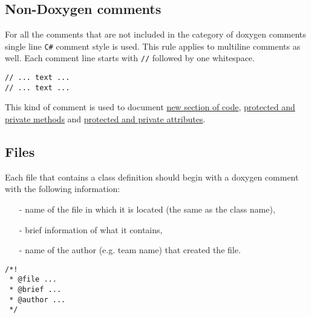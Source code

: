 \documentclass[10pt,a4paper]{article}
\begin{document}
\subsection{Non-Doxygen comments}
\noindent For all the comments that are not included in the category of doxygen comments single line \verb+C#+ comment style is used. This rule applies to multiline comments as well. Each comment line starts with \verb+//+ followed by one whitespace.
\begin{Verbatim}[frame=single]
// ... text ...
// ... text ...
\end{Verbatim}
\noindent This kind of comment is used to document \hyperref[general]{new section of code}, \hyperref[private-methods]{protected and private methods} and \hyperref[attributes]{protected and private attributes}.

\subsection{Files}\label{class-files}
\noindent Each file that contains a class definition should begin with a doxygen comment with the following information:
\begin{itemize}
 \item[-] name of the file in which it is located (the same as the class name),
 \item[-] brief information of what it contains,
 \item[-] name of the author (e.g. team name) that created the file.
\end{itemize}
\begin{Verbatim}[frame=single]
/*!
 * @file ...
 * @brief ...
 * @author ...
 */
\end{Verbatim}
\end{document}
